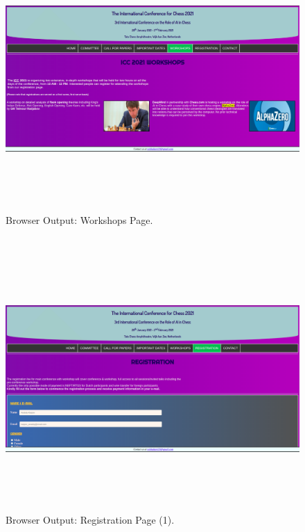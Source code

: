 \documentclass[12pt, a4]{article}
\begin{document}
\newpage
\subsection*{}
\begin{figure}[h]
\centering
\caption{Browser Output: Workshops Page.}
\includegraphics[height=10cm, width=18cm, keepaspectratio]{Output/Workshops.png}
\end{figure}

\newpage
\subsection*{}
\begin{figure}[h]
\centering
\caption{Browser Output: Registration Page (1).}
\includegraphics[height=10cm, width=18cm, keepaspectratio]{Output/Reg.png}
\end{figure}
\end{document}
